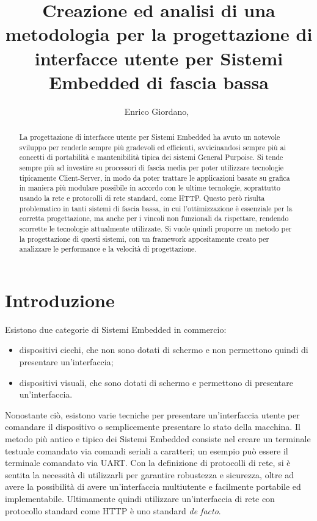 \documentclass[journal]{IEEEtran}
\begin{document}
\title{Creazione ed analisi di una metodologia per la progettazione di interfacce utente per Sistemi Embedded di fascia bassa}

\author{Enrico Giordano,~}


\maketitle


\begin{abstract}

La progettazione di interfacce utente per Sistemi Embedded ha avuto un notevole sviluppo per renderle sempre più gradevoli ed efficienti, avvicinandosi sempre più ai concetti di portabilità e mantenibilità tipica dei sistemi General Purpoise. Si tende sempre più ad investire su processori di fascia media per poter utilizzare tecnologie tipicamente Client-Server, in modo da poter trattare le applicazioni basate su grafica in maniera più modulare possibile in accordo con le ultime tecnologie, soprattutto usando la rete e protocolli di rete standard, come HTTP. Questo però risulta problematico in tanti sistemi di fascia bassa, in cui l'ottimizzazione è essenziale per la corretta progettazione, ma anche per i vincoli non funzionali da rispettare, rendendo scorrette le tecnologie attualmente utilizzate. Si vuole quindi proporre un metodo per la progettazione di questi sistemi, con un framework appositamente creato per analizzare le performance e la velocità di progettazione.

\end{abstract}
\IEEEpeerreviewmaketitle



\section{Introduzione}

Esistono due categorie di Sistemi Embedded in commercio:
\begin{itemize}
\item dispositivi ciechi, che non sono dotati di schermo e non permettono quindi di presentare un'interfaccia;
\item dispositivi visuali, che sono dotati di schermo e permettono di presentare un'interfaccia.
\end{itemize}

Nonostante ciò, esistono varie tecniche per presentare un'interfaccia utente per comandare il dispositivo o semplicemente presentare lo stato della macchina. Il metodo più antico e tipico dei Sistemi Embedded consiste nel creare un terminale testuale comandato via comandi seriali a caratteri; un esempio può essere il terminale comandato via UART. Con la definizione di protocolli di rete, si è sentita la necessità di utilizzarli per garantire robustezza e sicurezza, oltre ad avere la possibilità di avere un'interfaccia multiutente e facilmente portabile ed implementabile. Ultimamente quindi utilizzare un'interfaccia di rete con protocollo standard come HTTP è uno standard \textit{de facto}.
\end{document}
